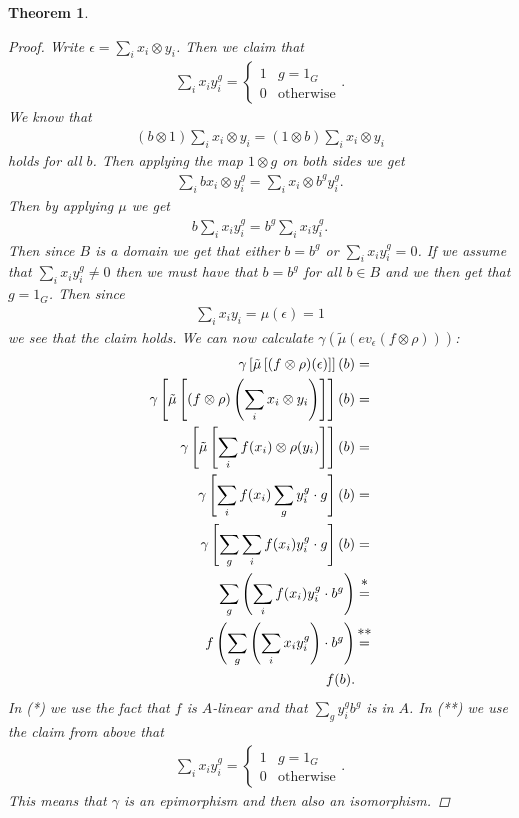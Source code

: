 \documentclass[11pt, a4paper, english]{article}
\newtheorem{theorem}{Theorem}[section]
\theoremstyle{definition}
\begin{document}
\begin{theorem}
\begin{proof}
Write $\epsilon = \sum\limits_i x_i \otimes y_i$. Then we claim that
\begin{align*}
\sum_i x_i y_i^g = \begin{cases}
1 & g = 1_G\\
0 & \text{otherwise}
\end{cases}.
\end{align*}
We know that
\begin{align*}
(b \otimes 1)\sum_i x_i \otimes y_i = (1 \otimes b)\sum_i x_i \otimes y_i
\end{align*}
holds for all $b$. Then applying the map $1 \otimes g$ on both sides we get
\begin{align*}
\sum_i bx_i \otimes y_i^g = \sum_i x_i \otimes b^gy_i^g.
\end{align*}
Then by applying $\mu$ we get
\begin{align*}
b\sum_i x_i y_i^g = b^g\sum_i x_i  y_i^g.
\end{align*}
Then since $B$ is a domain we get that either $b = b^g$ or $\sum_i x_i  y_i^g = 0$. If we assume that $\sum_i x_i  y_i^g \neq 0$ then we must have that $b = b^g$ for all $b \in B$ and we then get that $g = 1_G$. Then since
\begin{align*}
\sum_i x_i  y_i = \mu(\epsilon) = 1
\end{align*}
we see that the claim holds. We can now calculate $\gamma(\tilde{\mu}(ev_\epsilon(f \otimes \rho)))$:
\begin{align*}
\gamma \left[ \tilde{\mu} \left[ (f \otimes \rho)(\epsilon) \right] \right] (b) &=\\
\gamma \left[ \tilde{\mu} \left[ (f \otimes \rho)\left(\sum_i x_i \otimes y_i \right) \right] \right] (b) &=\\
\gamma \left[ \tilde{\mu} \left[ \sum_i f(x_i) \otimes \rho(y_i) \right] \right] (b) &=\\
\gamma \left[ \sum_i f(x_i) \sum_g y_i^g \cdot g \right] (b) &=\\
\gamma \left[ \sum_g \sum_i f(x_i) y_i^g \cdot g \right] (b) &=\\
\sum_g \left(\sum_i f(x_i) y_i^g \cdot b^g \right) &\stackrel{\mathclap{\normalfont\mbox{*}}}{=}\\
f \left( \sum_g \left(\sum_i x_i y_i^g \right) \cdot b^g \right) &\stackrel{\mathclap{\normalfont\mbox{**}}}{=}\\
f(b). &
\end{align*}
In (*) we use the fact that $f$ is $A$-linear and that $\sum_g y_i^g b^g$ is in $A$. In (**) we use the claim from above that
\begin{align*}
\sum_i x_i y_i^g = \begin{cases}
1 & g = 1_G\\
0 & \text{otherwise}
\end{cases}.
\end{align*}
This means that $\gamma$ is an epimorphism and then also an isomorphism.
\end{proof}
\end{theorem}
\end{document}
